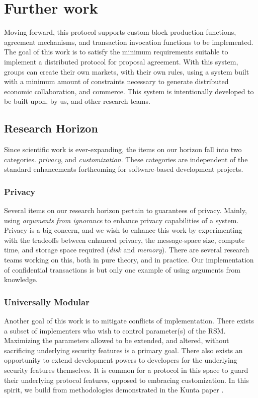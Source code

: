\documentclass[10pt, titlepage, twocolumn]{report}
\begin{document}
\section{Further work}
\hspace*{15pt}
Moving forward, this protocol supports custom block production functions, agreement mechanisms, and transaction invocation functions to be implemented. The goal of this work is to satisfy the minimum requirements suitable to implement a distributed protocol for proposal agreement. With this system, groups can create their own markets, with their own rules, using a system built with a minimum amount of constraints necessary to generate distributed economic collaboration, and commerce. This system is intentionally developed to be built upon, by us, and other research teams.

\subsection{Research Horizon}
\hspace*{15pt}
Since scientific work is ever-expanding, the items on our horizon fall into two categories. \textit{privacy}, and \textit{customization}. These categories are independent of the standard enhancements forthcoming for software-based development projects.

\subsubsection{Privacy}
\hspace*{15pt}
Several items on our research horizon pertain to guarantees of privacy. Mainly, using \textit{arguments from ignorance} to enhance privacy capabilities of a system. Privacy is a big concern, and we wish to enhance this work by experimenting with the tradeoffs between enhanced privacy, the message-space size, compute time, and storage space required (\textit{disk} and \textit{memory}). There are several research teams working on this, both in pure theory, and in practice. Our implementation of confidential transactions is but only one example of using arguments from knowledge.

\subsubsection{Universally Modular}
\hspace*{15pt}
Another goal of this work is to mitigate conflicts of implementation. There exists a subset of implementers who wish to control parameter(s) of the RSM. Maximizing the parameters allowed to be extended, and altered, without sacrificing underlying security features is a primary goal. There also exists an opportunity to extend development powers to developers for the underlying security features themselves. It is common for a protocol in this space to guard their underlying protocol features, opposed to embracing customization. In this spirit, we build from methodologies demonstrated in the Kunta paper \cite{KP}. 
\end{document}
